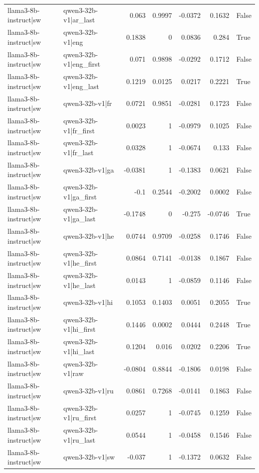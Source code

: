\begin{table}
\begin{tabular}{l l r r r r l}
llama3-8b-instruct|sw & qwen3-32b-v1|ar_last & 0.063 & 0.9997 & -0.0372 & 0.1632 & False \\
llama3-8b-instruct|sw & qwen3-32b-v1|eng & 0.1838 & 0 & 0.0836 & 0.284 & True \\
llama3-8b-instruct|sw & qwen3-32b-v1|eng_first & 0.071 & 0.9898 & -0.0292 & 0.1712 & False \\
llama3-8b-instruct|sw & qwen3-32b-v1|eng_last & 0.1219 & 0.0125 & 0.0217 & 0.2221 & True \\
llama3-8b-instruct|sw & qwen3-32b-v1|fr & 0.0721 & 0.9851 & -0.0281 & 0.1723 & False \\
llama3-8b-instruct|sw & qwen3-32b-v1|fr_first & 0.0023 & 1 & -0.0979 & 0.1025 & False \\
llama3-8b-instruct|sw & qwen3-32b-v1|fr_last & 0.0328 & 1 & -0.0674 & 0.133 & False \\
llama3-8b-instruct|sw & qwen3-32b-v1|ga & -0.0381 & 1 & -0.1383 & 0.0621 & False \\
llama3-8b-instruct|sw & qwen3-32b-v1|ga_first & -0.1 & 0.2544 & -0.2002 & 0.0002 & False \\
llama3-8b-instruct|sw & qwen3-32b-v1|ga_last & -0.1748 & 0 & -0.275 & -0.0746 & True \\
llama3-8b-instruct|sw & qwen3-32b-v1|he & 0.0744 & 0.9709 & -0.0258 & 0.1746 & False \\
llama3-8b-instruct|sw & qwen3-32b-v1|he_first & 0.0864 & 0.7141 & -0.0138 & 0.1867 & False \\
llama3-8b-instruct|sw & qwen3-32b-v1|he_last & 0.0143 & 1 & -0.0859 & 0.1146 & False \\
llama3-8b-instruct|sw & qwen3-32b-v1|hi & 0.1053 & 0.1403 & 0.0051 & 0.2055 & True \\
llama3-8b-instruct|sw & qwen3-32b-v1|hi_first & 0.1446 & 0.0002 & 0.0444 & 0.2448 & True \\
llama3-8b-instruct|sw & qwen3-32b-v1|hi_last & 0.1204 & 0.016 & 0.0202 & 0.2206 & True \\
llama3-8b-instruct|sw & qwen3-32b-v1|raw & -0.0804 & 0.8844 & -0.1806 & 0.0198 & False \\
llama3-8b-instruct|sw & qwen3-32b-v1|ru & 0.0861 & 0.7268 & -0.0141 & 0.1863 & False \\
llama3-8b-instruct|sw & qwen3-32b-v1|ru_first & 0.0257 & 1 & -0.0745 & 0.1259 & False \\
llama3-8b-instruct|sw & qwen3-32b-v1|ru_last & 0.0544 & 1 & -0.0458 & 0.1546 & False \\
llama3-8b-instruct|sw & qwen3-32b-v1|sw & -0.037 & 1 & -0.1372 & 0.0632 & False \\

\end{tabular}
\end{table}

